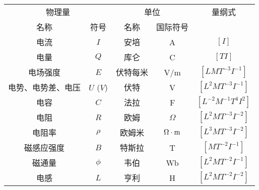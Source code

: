 \begin{center}
    \begin{tabular}{cc|cc|c}
  \hline
\multicolumn{2}{c|}{物理量} & \multicolumn{2}{c|}{单位} & 量纲式\\
名称 & 符号 & 名称 & 国际符号 \\
  \hline
电流   &  $I$ & 安培 & A & $[I]$\\
电量    &  $Q$  &  库仑  & C   & $[TI]$   \\
电场强度    &$E$    &  伏特每米  & V/m   &  $[LMT^{-3}I^{-1}]$  \\
电势、电势差、电压& $U$ ($V$)   &  伏特  &  V  &  $[L^2MT^{-3}I^{-1}]$  \\
电容    &  $C$  &  法拉  & F   &  $[L^{-2}M^{-1}T^{4}I^{2}]$   \\
电阻    & $R$  & 欧姆  &  $\Omega$ & $[L^2MT^{-3}I^{-2}]$  \\
电阻率    & $\rho$  & 欧姆米  &  $\Omega\cdot {\rm m}$ & $[L^3MT^{-3}I^{-2}]$  \\
磁感应强度    & $B$  & 特斯拉  & T  &  $[MT^{-2}I^{-1}]$ \\
磁通量    & $\phi$  & 韦伯  & Wb  & $[L^2MT^{-2}I^{-1}]$  \\
电感    & $L$  & 亨利  & H  &  $[L^2MT^{-2}I^{-2}]$ \\
  \hline      
    \end{tabular}
\end{center}

